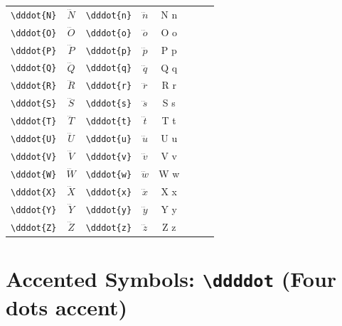 \documentclass[12pt,a4paper]{article}
\begin{document}
\begin{longtable}{|l|c|l|c|c|l|c|c|}
\verb|\dddot{N}| & $\dddot{N}$     & \verb|\dddot{n}| & $\dddot{n}$     & N⃛ n⃛            &                  &                 & \\
\verb|\dddot{O}| & $\dddot{O}$     & \verb|\dddot{o}| & $\dddot{o}$     & O⃛ o⃛            &                  &                 & \\
\verb|\dddot{P}| & $\dddot{P}$     & \verb|\dddot{p}| & $\dddot{p}$     & P⃛ p⃛            &                  &                 & \\
\verb|\dddot{Q}| & $\dddot{Q}$     & \verb|\dddot{q}| & $\dddot{q}$     & Q⃛ q⃛            &                  &                 & \\
\verb|\dddot{R}| & $\dddot{R}$     & \verb|\dddot{r}| & $\dddot{r}$     & R⃛ r⃛            &                  &                 & \\
\verb|\dddot{S}| & $\dddot{S}$     & \verb|\dddot{s}| & $\dddot{s}$     & S⃛ s⃛            &                  &                 & \\
\verb|\dddot{T}| & $\dddot{T}$     & \verb|\dddot{t}| & $\dddot{t}$     & T⃛ t⃛            &                  &                 & \\
\verb|\dddot{U}| & $\dddot{U}$     & \verb|\dddot{u}| & $\dddot{u}$     & U⃛ u⃛            &                  &                 & \\
\verb|\dddot{V}| & $\dddot{V}$     & \verb|\dddot{v}| & $\dddot{v}$     & V⃛ v⃛            &                  &                 & \\
\verb|\dddot{W}| & $\dddot{W}$     & \verb|\dddot{w}| & $\dddot{w}$     & W⃛ w⃛            &                  &                 & \\
\verb|\dddot{X}| & $\dddot{X}$     & \verb|\dddot{x}| & $\dddot{x}$     & X⃛ x⃛            &                  &                 & \\
\verb|\dddot{Y}| & $\dddot{Y}$     & \verb|\dddot{y}| & $\dddot{y}$     & Y⃛ y⃛            &                  &                 & \\
\verb|\dddot{Z}| & $\dddot{Z}$     & \verb|\dddot{z}| & $\dddot{z}$     & Z⃛ z⃛            &                  &                 & \\
\hline
\end{longtable}

\newpage

\section*{Accented Symbols: \texttt{\textbackslash ddddot} (Four dots accent)}
\end{document}
